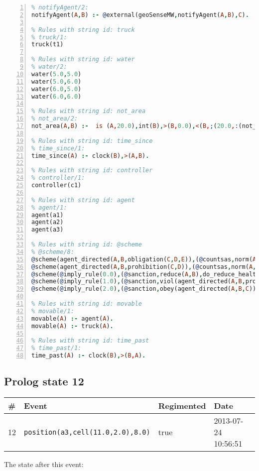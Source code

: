\documentclass[11pt]{article}\usepackage[utf8]{inputenc}\usepackage{geometry}
\begin{document}
\begin{lstlisting}[language=Prolog, numbers=left]
% Rules with string id: notifyAgent
% notifyAgent/2:
notifyAgent(A,B) :- @external(geoSenseMW,notifyAgent(A,B),C).

% Rules with string id: truck
% truck/1:
truck(t1)

% Rules with string id: water
% water/2:
water(5.0,5.0)
water(5.0,6.0)
water(6.0,5.0)
water(6.0,6.0)

% Rules with string id: not_area
% not_area/2:
not_area(A,B) :-  is (A,20.0),int(B),>(B,0.0),<(B,;(20.0,:(not_area(A,B), is (-(B),20.0)))),int(A),>(A,0.0),<(A,;(20.0,:(area(A,B),-(int(A))))),int(B),>(A,0.0),>(B,0.0),<(A,21.0),<(B,21.0).

% Rules with string id: time_since
% time_since/1:
time_since(A) :- clock(B),>(A,B).

% Rules with string id: controller
% controller/1:
controller(c1)

% Rules with string id: agent
% agent/1:
agent(a1)
agent(a2)
agent(a3)

% Rules with string id: @scheme
% @scheme/8:
@scheme(agent_directed(A,B,obligation(C,D,E)),(@countsas,norm(A,B,F,obligation(C,D,E)),F),false,(listTrue(C)),(time_past(D)),false,[plus(viol(agent_directed(A,B,obligation(C,D,E))))|[]],[plus(obey(agent_directed(A,B,obligation(C,D,E))))|[]])
@scheme(agent_directed(A,B,prohibition(C,D)),(@countsas,norm(A,B,E,prohibition(C,D)),E),(listTrue(C)),false,(false),false,[plus(viol(agent_directed(A,B,prohibition(C,D))))|[]],[plus(obey(agent_directed(A,B,prohibition(C,D))))|[]])
@scheme(@imply_rule(0.0),(@sanction,reduce(A,B),do_reduce_health(A,B),notifyAgent(A,changed(status))),true,false,false,false,[min(reduce(A,B))|[]],[])
@scheme(@imply_rule(1.0),(@sanction,viol(agent_directed(A,B,prohibition(C,D))),do_sanction(D)),true,false,false,false,[min(viol(agent_directed(A,B,prohibition(C,D))))|[]],[])
@scheme(@imply_rule(2.0),(@sanction,obey(agent_directed(A,B,C))),true,false,false,false,[min(obey(agent_directed(A,B,C)))|[]],[])

% Rules with string id: movable
% movable/1:
movable(A) :- agent(A).
movable(A) :- truck(A).

% Rules with string id: time_past
% time_past/1:
time_past(A) :- clock(B),>(B,A).

\end{lstlisting}
\clearpage 
\subsection{Prolog state 12}
\begin{table}[ht]
\centering 
\begin{tabular}{l l l l} 
\textbf{\#} & \textbf{Event} & \textbf{Regimented} & \textbf{Date} \\ [0.5ex] 
\hline
12&\texttt{position(a3,cell(11.0,2.0),8.0)}&true&2013-07-24 10:56:51\\ [1ex] \hline\end{tabular}
\end{table}
The state after this event:
\end{document}
